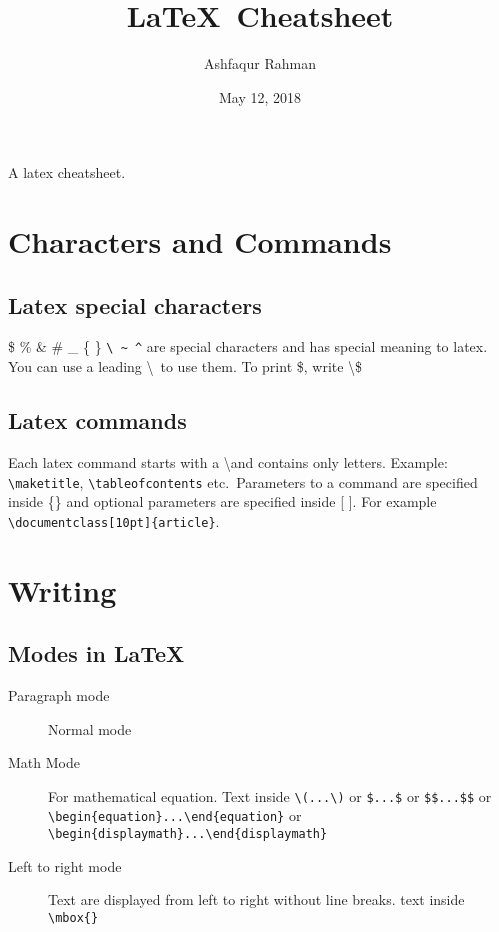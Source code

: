 \documentclass[11pt]{article}
\title{\LaTeX\ Cheatsheet}
\author{Ashfaqur Rahman}
\date{May 12, 2018}
\begin{document}
\maketitle
\tableofcontents
\newpage

A latex cheatsheet.

\section{Characters and Commands}

\subsection{Latex special characters}

\$ \% \& \# \_ \{ \} \verb=\ ~ ^= are special characters and has special meaning to latex.
You can use a leading \textbackslash\ to use them. To print \$, write \textbackslash\$

\subsection{Latex commands}

Each latex command starts with a \textbackslash and contains only letters.
Example: \verb=\maketitle=, \verb=\tableofcontents= etc.\ Parameters to
a command are specified inside \{\} and optional parameters are specified
inside [ ]. For example \verb=\documentclass[10pt]{article}=.

\section{Writing}

\subsection{Modes in \LaTeX}

\begin{description}
	\item[Paragraph mode] Normal mode
	\item[Math Mode] For mathematical equation. Text inside \verb=\(...\)= or \verb=$...$= or \verb=$$...$$= or \verb=\begin{equation}...\end{equation}= or \verb=\begin{displaymath}...\end{displaymath}=
	\item[Left to right mode] Text are displayed from left to right without line breaks. text inside \verb=\mbox{}=
\end{description}
\end{document}
